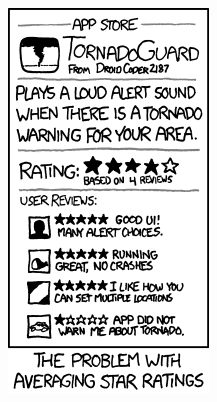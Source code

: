 \begin{figure}[htbp!]
\centering
\begin{minipage}{.4\textwidth}
  \centering
  \includegraphics[width=\textwidth]{images/xkcd/tornadoguard.png}
  \label{fig:xkcd-tornadoguard}
\end{minipage}\hfill%

\end{figure}
